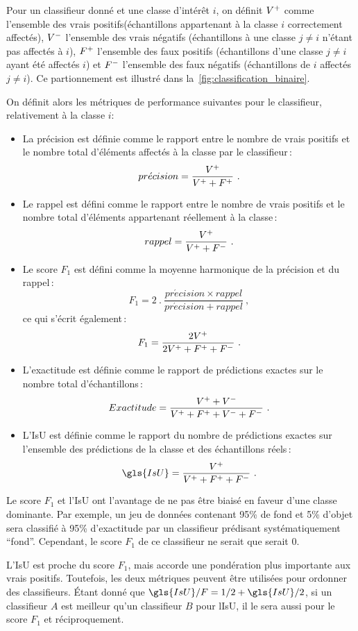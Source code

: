 Pour un classifieur donné et une classe d'intérêt $i$, on définit $V^+$ comme l'ensemble des vrais positifs(échantillons appartenant à la classe $i$ correctement affectés), $V^-$ l'ensemble des vrais négatifs (échantillons à une classe $j \neq i$ n'étant pas affectés à $i$), $F^+$ l'ensemble des faux positifs (échantillons d'une classe $j \neq i$ ayant été affectés $i$) et $F^-$ l'ensemble des faux négatifs (échantillons de $i$ affectés $j \neq i$). Ce partionnement est illustré dans la~\cref{fig:classification_binaire}.

On définit alors les métriques de performance suivantes pour le classifieur, relativement à la classe $i$:
\begin{itemize}
	\item La précision est définie comme le rapport entre le nombre de vrais positifs et le nombre total d'éléments affectés à la classe par le classifieur\,:
$$pr\acute{e}cision = \frac{V^+}{V^+ + F^+}~.$$
	\item Le rappel est défini comme le rapport entre le nombre de vrais positifs et le nombre total d'éléments appartenant réellement à la classe\,:
$$rappel = \frac{V^+}{V^+ + F^-}~.$$
	\item Le score $F_1$ est défini comme la moyenne harmonique de la précision et du rappel\,:
$$F_1 = 2~.~\frac{pr\acute{e}cision \times rappel}{pr\acute{e}cision + rappel}~,$$
ce qui s'écrit également\,:
$$F_1 = \frac{2 V^+}{2 V^+ + F^+ + F^-}~.$$
	\item L'exactitude est définie comme le rapport de prédictions exactes sur le nombre total d'échantillons\,:
$$Exactitude = \frac{V^+ + V^-}{V^+ + F^+ + V^- + F^-}~.$$
	\item L'\gls{IsU} est définie comme le rapport du nombre de prédictions exactes sur l'ensemble des prédictions de la classe et des échantillons réels\,:
$$\gls{IsU} = \frac{\tp}{\tp + \fp + \fn}~.$$
\end{itemize}

Le score $F_1$ et l'\gls{IsU} ont l'avantage de ne pas être biaisé en faveur d'une classe dominante. Par exemple, un jeu de données contenant 95\% de fond et 5\% d'objet sera classifié à 95\% d'exactitude par un classifieur prédisant systématiquement ``fond''. Cependant, le score $F_1$ de ce classifieur ne serait que serait $0$.

L'\gls{IsU} est proche du score $F_1$, mais accorde une pondération plus importante aux vrais positifs. Toutefois, les deux métriques peuvent être utilisées pour ordonner des classifieurs. Étant donné que $\gls{IsU}/F = 1/2 + \gls{IsU}/2$, si un classifieur $A$ est meilleur qu'un classifieur $B$ pour l\gls{IsU}, il le sera aussi pour le score $F_1$ et réciproquement.


